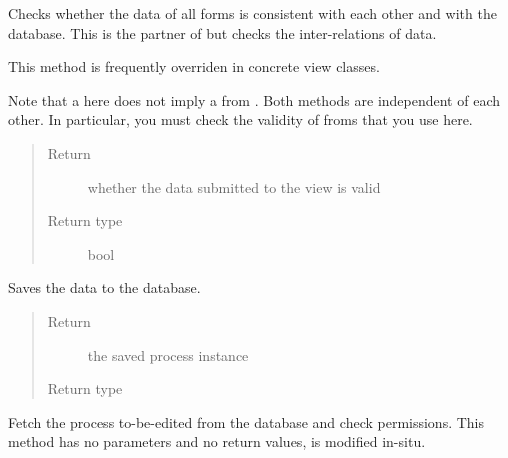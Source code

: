 \documentclass[a4paper,11pt,english]{sphinxmanual}
\begin{document}
\begin{fulllineitems}

\begin{fulllineitems}
\label{programming/class-based_views:samples.utils.views.class_views.ProcessWithoutSamplesView.is_referentially_valid}
Checks whether the data of all forms is consistent with each other
and with the database.  This is the partner of 
but checks the inter-relations of data.

This method is frequently overriden in concrete view classes.

Note that a  here does not imply a  from
.  Both methods are independent of each other.
In particular, you must check the validity of froms that you use here.
\begin{quote}\begin{description}
\item[{Return}] \leavevmode
whether the data submitted to the view is valid

\item[{Return type}] \leavevmode
bool

\end{description}\end{quote}

\end{fulllineitems}


\begin{fulllineitems}
\label{programming/class-based_views:samples.utils.views.class_views.ProcessWithoutSamplesView.save_to_database}
Saves the data to the database.
\begin{quote}\begin{description}
\item[{Return}] \leavevmode
the saved process instance

\item[{Return type}] \leavevmode
{}

\end{description}\end{quote}

\end{fulllineitems}


\begin{fulllineitems}
\label{programming/class-based_views:samples.utils.views.class_views.ProcessWithoutSamplesView.startup}
Fetch the process to-be-edited from the database and check permissions.
This method has no parameters and no return values,  is
modified in-situ.

\end{fulllineitems}


\end{fulllineitems}
\end{document}
